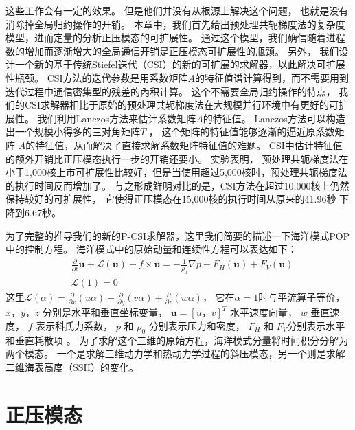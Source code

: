 这些工作会有一定的效果。 
但是他们并没有从根源上解决这个问题， 也就是没有消除掉全局归约操作的开销。 
本章中，我们首先给出预处理共轭梯度法的复杂度模型，进而定量的分析正压模态的可扩展性。 
通过这个模型，我们确信随着进程数的增加而逐渐增大的全局通信开销是正压模态可扩展性的瓶颈。 
另外，  我们设计一个新的基于传统Stiefel迭代（CSI）的新的可扩展的求解器，以此解决可扩展性瓶颈。 
CSI方法的迭代参数是用系数矩阵$A$的特征值谱计算得到，而不需要用到迭代过程中通信密集型的残差的內积计算。
这个不需要全局归约操作的特点， 我们的CSI求解器相比于原始的预处理共轭梯度法在大规模并行环境中有更好的可扩展性。  
我们利用Lanczos方法来估计系数矩阵$A$的特征值。 
Lanczos方法可以构造出一个规模小得多的三对角矩阵$T$ ， 这个矩阵的特征值能够逐渐的逼近原系数矩阵 $A$的特征值，从而解决了直接求解系数矩阵特征值的难题。 
CSI中估计特征值的额外开销比正压模态执行一步的开销还要小。 
实验表明， 预处理共轭梯度法在小于1,000核上市可扩展性比较好，但是当使用超过5,000核时，预处理共轭梯度法的执行时间反而增加了。 
与之形成鲜明对比的是，CSI方法在超过10,000核上仍然保持较好的可扩展性， 它使得正压模态在15,000核的执行时间从原来的41.96秒 下降到6.67秒。 


为了完整的推导我们的新的P-CSI求解器，这里我们简要的描述一下海洋模式POP中的控制方程。
海洋模式中的原始动量和连续性方程可以表达如下：
\begin{align}
&\frac{\partial }{\partial t} \textbf{u} +\mathcal{L}(\textbf{u}) + f\times \textbf{u} = - \frac{1}{\rho_0}\nabla p +F_H(\textbf{u}) +F_V(\textbf{u}) \label{eq:momen}\\
&\mathcal{L}(1) = 0 \label{eq:continuous}
\end{align}
这里$\mathcal{L}(\alpha ) = \frac{\partial }{\partial x} (u\alpha)  +\frac{\partial }{\partial y} (v\alpha) +\frac{\partial }{\partial z} (w\alpha)$， 它在$\alpha =1$时与平流算子等价， $x，y，z$ 分别是水平和垂直坐标变量， $\textbf{u} = [u，v]^T$ 水平速度向量， $w$ 垂直速度， $f$ 表示科氏力系数，  $p$ 和 $\rho_0$ 分别表示压力和密度， $F_H$ 和 $F_V$分别表示水平和垂直耗散项 \cite{smith2010parallel}。  
为了求解这个三维的原始方程，海洋模式分量将时间积分分解为两个模态。 一个是求解三维动力学和热动力学过程的斜压模态，另一个则是求解二维海表高度（SSH）的变化。

\section{正压模态} \label{solver:mode}


